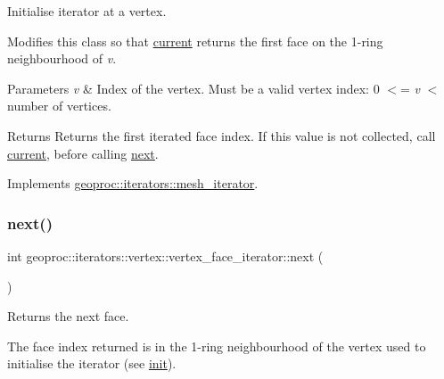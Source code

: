 Initialise iterator at a vertex. 

Modifies this class so that \hyperlink{classgeoproc_1_1iterators_1_1vertex_1_1vertex__face__iterator_aa75fe423e210cf4e20e721307c80f6fb}{current} returns the first face on the 1-\/ring neighbourhood of {\itshape v}.


\begin{DoxyParams}{Parameters}
{\em v} & Index of the vertex. Must be a valid vertex index\+: 0 $<$= {\itshape v} $<$ number of vertices. \\
\hline
\end{DoxyParams}
\begin{DoxyReturn}{Returns}
Returns the first iterated face index. If this value is not collected, call \hyperlink{classgeoproc_1_1iterators_1_1vertex_1_1vertex__face__iterator_aa75fe423e210cf4e20e721307c80f6fb}{current}, before calling \hyperlink{classgeoproc_1_1iterators_1_1vertex_1_1vertex__face__iterator_aa2a7fb3ee7e703d815e7f1664fbd99d4}{next}. 
\end{DoxyReturn}


Implements \hyperlink{classgeoproc_1_1iterators_1_1mesh__iterator_a8a4d8b5c84941dd0a7cb7373abcd3fcc}{geoproc\+::iterators\+::mesh\+\_\+iterator}.

\mbox{\label{classgeoproc_1_1iterators_1_1vertex_1_1vertex__face__iterator_aa2a7fb3ee7e703d815e7f1664fbd99d4}} 
\subsubsection{\texorpdfstring{next()}{next()}}
{\footnotesize\ttfamily int geoproc\+::iterators\+::vertex\+::vertex\+\_\+face\+\_\+iterator\+::next (\begin{DoxyParamCaption}{ }\end{DoxyParamCaption})\hspace{0.3cm}{\ttfamily [virtual]}}



Returns the next face. 

The face index returned is in the 1-\/ring neighbourhood of the vertex used to initialise the iterator (see \hyperlink{classgeoproc_1_1iterators_1_1vertex_1_1vertex__face__iterator_a713d8d9edb7121c729b5717261fd8b3b}{init}).

